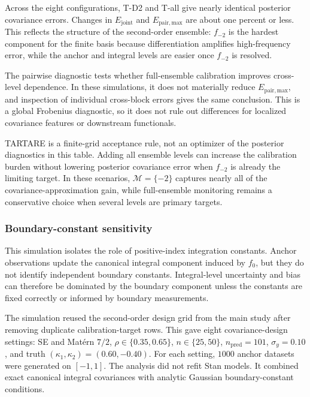 \documentclass[11pt,a4paper]{article}
\theoremstyle{definition}
\theoremstyle{remark}
\begin{document}
Across the eight configurations, T-D2 and T-all give nearly identical posterior covariance errors. Changes in \(E_{\mathrm{joint}}\) and \(E_{\mathrm{pair,max}}\) are about one percent or less. This reflects the structure of the second-order ensemble: \(f_{-2}\) is the hardest component for the finite basis because differentiation amplifies high-frequency error, while the anchor and integral levels are easier once \(f_{-2}\) is resolved.

The pairwise diagnostic tests whether full-ensemble calibration improves cross-level dependence. In these simulations, it does not materially reduce \(E_{\mathrm{pair,max}}\), and inspection of individual cross-block errors gives the same conclusion. This is a global Frobenius diagnostic, so it does not rule out differences for localized covariance features or downstream functionals.

TARTARE is a finite-grid acceptance rule, not an optimizer of the posterior diagnostics in this table. Adding all ensemble levels can increase the calibration burden without lowering posterior covariance error when \(f_{-2}\) is already the limiting target. In these scenarios, \(\mathcal M=\{-2\}\) captures nearly all of the covariance-approximation gain, while full-ensemble monitoring remains a conservative choice when several levels are primary targets.

\subsubsection{Boundary-constant sensitivity}\label{appendix:boundary-constant-sensitivity}

This simulation isolates the role of positive-index integration constants. Anchor observations update the canonical integral component induced by \(f_0\), but they do not identify independent boundary constants. Integral-level uncertainty and bias can therefore be dominated by the boundary component unless the constants are fixed correctly or informed by boundary measurements.

The simulation reused the second-order design grid from the main study after removing duplicate calibration-target rows. This gave eight covariance-design settings: SE and Mat\'ern \(7/2\), \(\rho\in\{0.35,0.65\}\), \(n\in\{25,50\}\), \(n_{\mathrm{pred}}=101\), \(\sigma_y=0.10\), and truth \((\kappa_1,\kappa_2)=(0.60,-0.40)\). For each setting, \(1000\) anchor datasets were generated on \([-1,1]\). The analysis did not refit Stan models. It combined exact canonical integral covariances with analytic Gaussian boundary-constant conditions.
\end{document}
